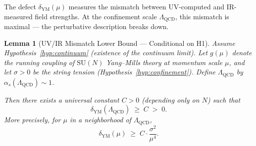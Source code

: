 \documentclass[11pt]{article}
\newtheorem{lemma}{Lemma}
\theoremstyle{definition}
\begin{document}
The defect $\delta_{\mathrm{YM}}(\mu)$ measures the mismatch between UV-computed and
IR-measured field strengths.  At the confinement scale $\Lambda_{\mathrm{QCD}}$,
this mismatch is maximal --- the perturbative description breaks down.

\begin{lemma}[UV/IR Mismatch Lower Bound --- Conditional on H1]
\label{lem:uv-ir-bound}
Assume Hypothesis~\ref{hyp:continuum} (existence of the continuum limit).
Let $g(\mu)$ denote the running coupling of $\mathrm{SU}(N)$ Yang--Mills theory
at momentum scale $\mu$, and let $\sigma > 0$ be the string tension
(Hypothesis~\ref{hyp:confinement}).  Define $\Lambda_{\mathrm{QCD}}$ by
$\alpha_s(\Lambda_{\mathrm{QCD}}) \sim 1$.

Then there exists a universal constant $C > 0$ (depending only on $N$) such that
\[
  \delta_{\mathrm{YM}}(\Lambda_{\mathrm{QCD}}) \;\geq\; C \;>\; 0.
\]
More precisely, for $\mu$ in a neighborhood of $\Lambda_{\mathrm{QCD}}$,
\[
  \delta_{\mathrm{YM}}(\mu) \;\geq\; C \cdot \frac{\sigma^2}{\mu^4}.
\]
\end{lemma}
\end{document}
